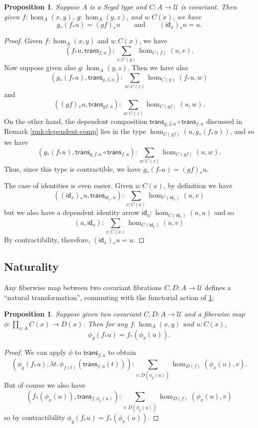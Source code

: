 \documentclass{amsart}
\theoremstyle{plain}
\newtheorem{prop}[thm]{Proposition}
\theoremstyle{definition}
\theoremstyle{remark}
\numberwithin{equation}{section}
\newcommand{\univtype}{\mathcal{U}}
\newcommand{\lam}[1]{\lambda #1.\,}
\newcommand{\idarr}[1]{\mathsf{id}_{#1}}
\newcommand{\covtr}[1]{{#1}_*}  %
\newcommand{\istrans}[2]{\mathsf{trans}_{#1,#2}}
\begin{document}
\begin{prop}\label{prop:functorial-fibration} Suppose $A$ is a Segal type and $C:A\to\univtype$ is covariant. Then given $f:\hom_A(x,y)$, $g:\hom_A(y,z)$, and $u:C(x)$, we have 
\[\covtr g (\covtr f u) = \covtr{(gf)} u \qquad \mathrm{and} \qquad \covtr{(\idarr x)}u = u.\]
\end{prop}
\begin{proof}
Given $f:\hom_A(x,y)$ and $u:C(x)$, we have
\[ (\covtr f u, \istrans{f}{u}) : \sum_{v:C(y)} \hom_{C(f)}(u,v).\] 
Now suppose given also $g:\hom_A(y,z)$.
Then we have also
\[(\covtr g (\covtr f u), \istrans g {\covtr f u}) : \sum_{w:C(z)} \hom_{C(g)}(\covtr f u,w)\]
and
\[(\covtr{(gf)} u, \istrans{gf}{u}) : \sum_{w:C(z)} \hom_{C(gf)}(u,w). \]
On the other hand, the dependent composition $\istrans g {\covtr f u} \circ \istrans f u$ discussed in Remark \ref{rmk:dependent-comp} lies in the type $\hom_{C(gf)}(u,\covtr g (\covtr f u))$, and so we have
\[(\covtr g (\covtr f u),\istrans g {\covtr f u} \circ \istrans f u) : \sum_{w:C(z)} \hom_{C(gf)}(u,w). \]
Thus, since this type is contractible, we have $\covtr g (\covtr f u) = \covtr{(gf)} u$.

The case of identities is even easier.
Given $u:C(x)$, by definition we have
\[(\covtr{(\idarr x)}u,\istrans {\idarr x}u):\sum_{v:C(x)}\hom_{C(\idarr x)}(u,v)\]
but we also have a dependent identity arrow $\idarr u : \hom_{C(\idarr x)}(u,u)$ and so
\[(u,\idarr u) : \sum_{v:C(x)}\hom_{C(\idarr x)}(u,v) \]
By contractibility, therefore, $\covtr{(\idarr x)}u = u$.
\end{proof}


\subsection{Naturality}
\label{sec:covar-nat}

Any fiberwise map between two covariant fibrations $C,D:A\to\univtype$ defines a ``natural transformation'', commuting with the functorial action of \cref{prop:functorial-fibration}:

\begin{prop}\label{prop:natural-fibration}
Suppose given two covariant $C,D:A\to\univtype$ and a fiberwise map $\phi:\prod_{x:A} C(x) \to D(x)$.
Then for any $f:\hom_A(x,y)$ and $u:C(x)$, \[\phi_y(\covtr f u)= \covtr f (\phi_x(u)).\]
\end{prop}
\begin{proof}
We can apply $\phi$ to $\istrans f u$ to obtain
\[ (\phi_y(\covtr f u), \lam{t}\phi_{f(t)}(\istrans f u(t))) : \sum_{v:D(\phi_y(u))} \hom_{D(f)}(\phi_x(u),v). \]
But of course we also have
\[ (\covtr f (\phi_x(u)), \istrans f {\phi_x(u)}) : \sum_{v:D(\phi_y(u))} \hom_{D(f)}(\phi_x(u),v) \]
so by contractibility $\phi_y(\covtr f u)= \covtr f (\phi_x(u))$.
\end{proof}
\end{document}
